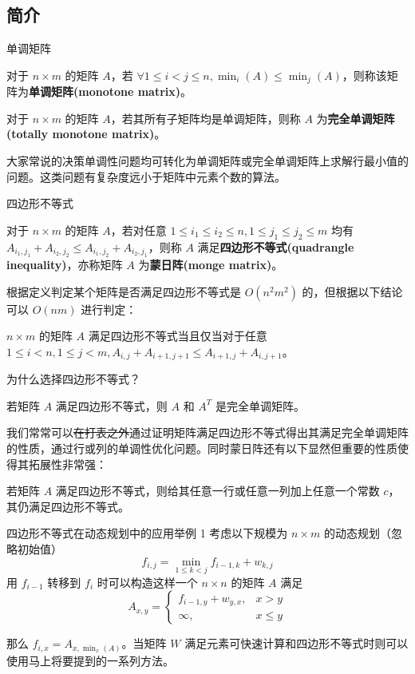 \documentclass{beamer}
\begin{document}
\subsection{简介}
\begin{frame}{单调矩阵}
	\begin{definition}[单调矩阵]
		对于 $n \times m$ 的矩阵 $A$，若 $\forall 1 \leq i < j \leq n, \min_i(A) \leq \min_j(A)$，则称该矩阵为\textbf{单调矩阵(monotone matrix)}。
	\end{definition}
	\begin{definition}[完全单调矩阵]
		对于 $n \times m$ 的矩阵 $A$，若其所有子矩阵均是单调矩阵，则称 $A$ 为\textbf{完全单调矩阵(totally monotone matrix)}。
	\end{definition}
	大家常说的决策单调性问题均可转化为单调矩阵或完全单调矩阵上求解行最小值的问题。这类问题有复杂度远小于矩阵中元素个数的算法。
\end{frame}
\begin{frame}{四边形不等式}
	\begin{definition}[四边形不等式]
		对于 $n \times m$ 的矩阵 $A$，若对任意 $1 \leq i_1 \leq i_2 \leq n, 1 \leq j_1 \leq j_2 \leq m$ 均有 $A_{i_1,j_1} + A_{i_2,j_2} \leq A_{i_1,j_2}+A_{i_2,j_1}$，则称 $A$ 满足\textbf{四边形不等式(quadrangle inequality)}，亦称矩阵 $A$ 为\textbf{蒙日阵(monge matrix)}。
	\end{definition}
	根据定义判定某个矩阵是否满足四边形不等式是 $O(n^2m^2)$ 的，但根据以下结论可以 $O(nm)$ 进行判定：
	\begin{theorem}[四边形不等式判定]
		$n \times m$ 的矩阵 $A$ 满足四边形不等式当且仅当对于任意 $1 \leq i < n, 1 \leq j < m, A_{i,j} + A_{i+1,j+1} \leq A_{i+1,j}+A_{i,j+1}$。
	\end{theorem}
\end{frame}
\begin{frame}{为什么选择四边形不等式？}
	\begin{theorem}
		若矩阵 $A$ 满足四边形不等式，则 $A$ 和 $A^T$ 是完全单调矩阵。
	\end{theorem}
	
	我们常常可以\sout{在打表之外}通过证明矩阵满足四边形不等式得出其满足完全单调矩阵的性质，通过行或列的单调性优化问题。同时蒙日阵还有以下显然但重要的性质使得其拓展性非常强：
	
	\begin{lemma}[]
		若矩阵 $A$ 满足四边形不等式，则给其任意一行或任意一列加上任意一个常数 $c$，其仍满足四边形不等式。
	\end{lemma}
\end{frame}
\begin{frame}{四边形不等式在动态规划中的应用举例 1}
考虑以下规模为 $n \times m$ 的动态规划（忽略初始值） $$f_{i,j} = \min_{1 \leq k < j} f_{i-1,k} + w_{k,j}$$用 $f_{i-1}$ 转移到 $f_i$ 时可以构造这样一个 $n \times n$ 的矩阵 $A$ 满足 $$ A_{x,y} = \begin{cases}
f_{i-1,y} + w_{y,x}, & x>y\\
\infty, & x \leq y
\end{cases} $$

那么 $f_{i,x} = A_{x,\min_x(A)}$。当矩阵 $W$ 满足元素可快速计算和四边形不等式时则可以使用马上将要提到的一系列方法。
\end{frame}
\end{document}
